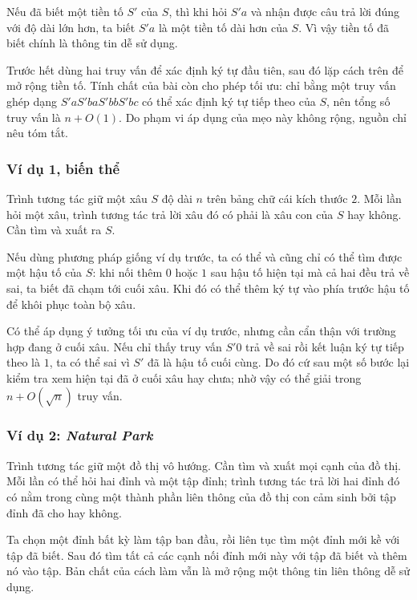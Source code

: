 \documentclass[11pt]{article}
\begin{document}
Nếu đã biết một tiền tố $S'$ của $S$, thì khi hỏi $S'a$ và nhận được câu trả lời
đúng với độ dài lớn hơn, ta biết $S'a$ là một tiền tố dài hơn của $S$. Vì vậy
tiền tố đã biết chính là thông tin dễ sử dụng.

Trước hết dùng hai truy vấn để xác định ký tự đầu tiên, sau đó lặp cách trên để
mở rộng tiền tố. Tính chất của bài còn cho phép tối ưu: chỉ bằng một truy vấn
ghép dạng $S'aS'baS'bbS'bc$ có thể xác định ký tự tiếp theo của $S$, nên tổng số
truy vấn là $n+O(1)$. Do phạm vi áp dụng của mẹo này không rộng, nguồn chỉ nêu
tóm tắt.

\subsubsection{Ví dụ 1, biến thể}

Trình tương tác giữ một xâu $S$ độ dài $n$ trên bảng chữ cái kích thước $2$.
Mỗi lần hỏi một xâu, trình tương tác trả lời xâu đó có phải là xâu con của
$S$ hay không. Cần tìm và xuất ra $S$.

Nếu dùng phương pháp giống ví dụ trước, ta có thể và cũng chỉ có thể tìm được
một hậu tố của $S$: khi nối thêm $0$ hoặc $1$ sau hậu tố hiện tại mà cả hai đều
trả về sai, ta biết đã chạm tới cuối xâu. Khi đó có thể thêm ký tự vào phía
trước hậu tố để khôi phục toàn bộ xâu.

Có thể áp dụng ý tưởng tối ưu của ví dụ trước, nhưng cần cẩn thận với trường
hợp đang ở cuối xâu. Nếu chỉ thấy truy vấn $S'0$ trả về sai rồi kết luận ký tự
tiếp theo là $1$, ta có thể sai vì $S'$ đã là hậu tố cuối cùng. Do đó cứ sau
một số bước lại kiểm tra xem hiện tại đã ở cuối xâu hay chưa; nhờ vậy có thể
giải trong $n+O(\sqrt n)$ truy vấn.

\subsubsection{Ví dụ 2: \emph{Natural Park}}

Trình tương tác giữ một đồ thị vô hướng. Cần tìm và xuất mọi cạnh của đồ thị.
Mỗi lần có thể hỏi hai đỉnh và một tập đỉnh; trình tương tác trả lời hai đỉnh
đó có nằm trong cùng một thành phần liên thông của đồ thị con cảm sinh bởi tập
đỉnh đã cho hay không.

Ta chọn một đỉnh bất kỳ làm tập ban đầu, rồi liên tục tìm một đỉnh mới kề với
tập đã biết. Sau đó tìm tất cả các cạnh nối đỉnh mới này với tập đã biết và
thêm nó vào tập. Bản chất của cách làm vẫn là mở rộng một thông tin liên thông
dễ sử dụng.
\end{document}
